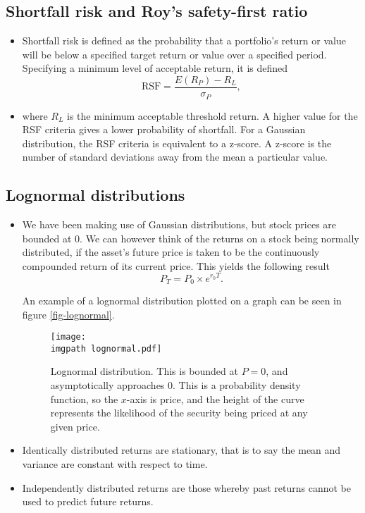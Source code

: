 \documentclass[../notes_compiled.tex]{subfiles}
\begin{document}
\subsection{Shortfall risk and Roy's safety-first ratio}
\begin{itemize}
\item Shortfall risk is defined as the probability that a portfolio's return or value will be below a specified target return or value over a specified period. Specifying a minimum level of acceptable return, it is defined
\begin{equation}
\mathrm{RSF} = \frac{E(R_{P})-R_{L}}{\sigma_{P}},
\end{equation}
\item[] where $R_{L}$ is the minimum acceptable threshold return. A higher value for the RSF criteria gives a lower probability of shortfall. For a Gaussian distribution, the RSF criteria is equivalent to a z-score. A z-score is the number of standard deviations away from the mean a particular value.
\end{itemize}


\subsection{Lognormal distributions}
\begin{itemize}
\item We have been making use of Gaussian distributions, but stock prices are bounded at 0. We can however think of the returns on a stock being normally distributed, if the asset's future price is taken to be the continuously compounded return of its current price. This yields the following result
\begin{equation}
P_{T} = P_{0} \times e^{r_{0}T}.
\end{equation}

An example of a lognormal distribution plotted on a graph can be seen in figure \ref{fig-lognormal}.

\begin{figure}[h]
  \centering
  \texttt{[image: \\imgpath lognormal.pdf]}
  \caption{Lognormal distribution. This is bounded at $P=0$, and asymptotically approaches 0. This is a probability density function, so the $x$-axis is price, and the height of the curve represents the likelihood of the security being priced at any given price.}
\end{figure}

\item Identically distributed returns are stationary, that is to say the mean and variance are constant with respect to time.
\item Independently distributed returns are those whereby past returns cannot be used to predict future returns.
\end{itemize}
\end{document}
